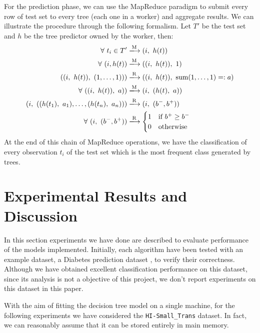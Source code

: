 \documentclass[12pt]{article}
\newcommand{\map}{\xlongrightarrow{\text{M}}}
\newcommand{\reduce}{\xlongrightarrow{\text{R}}}
\begin{document}
For the prediction phase, we can use the MapReduce paradigm to submit every row of test set to every tree (each one in a worker) and aggregate results.
We can illustrate the procedure through the following formalism. Let $T'$ be the test set and $h$ be the tree predictor owned by the worker, then:
%
\begin{equation*}
    \begin{aligned}
        \forall \ t_i \in T' & \map (i, \ h(t)) \\
        \forall \ (i, h(t))  & \map ((i, \ h(t)), \ 1) \\
        ((i, \ h(t)), \ (1, \dots, 1))) & \reduce ((i, \ h(t)), \ \text{sum}(1, \dots, 1) =: a ) \\
        \forall \ ((i, \ h(t)), \ a)) & \map (i, \ (h(t), \ a)) \\
        (i, \ ((h(t_1), \ a_1), \dots, (h(t_n), \ a_n))) & \reduce (i, \ (b^-, b^+)) \\
        \forall \ (i, \ (b^-, b^+)) & \reduce
            \begin{cases}
                1 & \text{if } b^+ \ge b^-\\
                0 & \text{otherwise}
            \end{cases}
    \end{aligned}
\end{equation*}
%
At the end of this chain of MapReduce operations, we have the classification of every observation $t_i$ of the test set which is the most frequent class generated by trees.


\newpage
\section{Experimental Results and Discussion}
In this section experiments we have done are described to evaluate performance of the models implemented.
%
Initially, each algorithm have been tested with an example dataset, a Diabetes prediction dataset \cite{DiabetesDataset}, to verify their correctness. Although we have obtained excellent classification performance on this dataset, since its analysis is not a objective of this project, we don't report experiments on this dataset in this paper.


With the aim of fitting the decision tree model on a single machine, for the following experiments we have considered the \texttt{HI-Small\_Trans} dataset. In fact, we can reasonably assume that it can be stored entirely in main memory.
\end{document}
